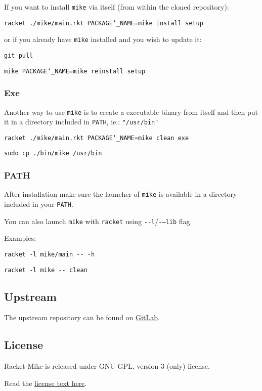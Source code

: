 \documentclass{article}
\newcommand{\Scribtexttt}[1]{{\texttt{#1}}}
\let\SOriginalthesubsubsection\thesubsubsection
\newcommand{\Ssubsection}[2]{\subsection[#1]{#2}\let\thesubsubsection\SOriginalthesubsubsection}
\newcommand{\Ssubsubsection}[2]{\subsubsection[#1]{#2}}
\begin{document}
If you want to install \Scribtexttt{mike} via itself
(from within the cloned repository):


\noindent \mbox{\hphantom{\Scribtexttt{xx}}}\Scribtexttt{racket {\hbox{\texttt{.}}}/mike/main{\hbox{\texttt{.}}}rkt PACKAGE{\char`\_}NAME=mike install setup}

or if you already have \Scribtexttt{mike} installed and you wish to update it:


\noindent \mbox{\hphantom{\Scribtexttt{xx}}}\Scribtexttt{git pull}

\noindent \mbox{\hphantom{\Scribtexttt{xx}}}\Scribtexttt{mike PACKAGE{\char`\_}NAME=mike reinstall setup}

\Ssubsubsection{Exe}{Exe}\label{t:x28part_x22Exex22x29}

Another way to use \Scribtexttt{mike} is to create a executable binary from itself
and then put it in a directory included in \Scribtexttt{PATH},
ie.: \Scribtexttt{"/usr/bin"}


\noindent \mbox{\hphantom{\Scribtexttt{xx}}}\Scribtexttt{racket {\hbox{\texttt{.}}}/mike/main{\hbox{\texttt{.}}}rkt PACKAGE{\char`\_}NAME=mike clean exe}

\noindent \mbox{\hphantom{\Scribtexttt{xx}}}\Scribtexttt{sudo cp {\hbox{\texttt{.}}}/bin/mike /usr/bin}

\Ssubsubsection{PATH}{PATH}\label{t:x28part_x22PATHx22x29}

After installation make sure the launcher of \Scribtexttt{mike}
is available in a directory included in your \Scribtexttt{PATH}.

You can also launch \Scribtexttt{mike} with \Scribtexttt{racket}
using \mbox{\Scribtexttt{{-}{-}l}}/\mbox{\Scribtexttt{{-}{--}lib}} flag.

Examples:


\noindent \mbox{\hphantom{\Scribtexttt{xx}}}\Scribtexttt{racket {-}l mike/main {-}{-} {-}h}

\noindent \mbox{\hphantom{\Scribtexttt{xx}}}\Scribtexttt{racket {-}l mike {-}{-} clean}

\Ssubsection{Upstream}{Upstream}\label{t:x28part_x22Upstreamx22x29}

The upstream repository can be found on
\href{https://gitlab.com/xgqt/racket-mike}{GitLab}.

\Ssubsection{License}{License}\label{t:x28part_x22Licensex22x29}

Racket{-}Mike is released under GNU GPL, version 3 (only) license.

Read the
\href{https://spdx.org/licenses/GPL-3.0-only.html}{license text here}.
\end{document}
